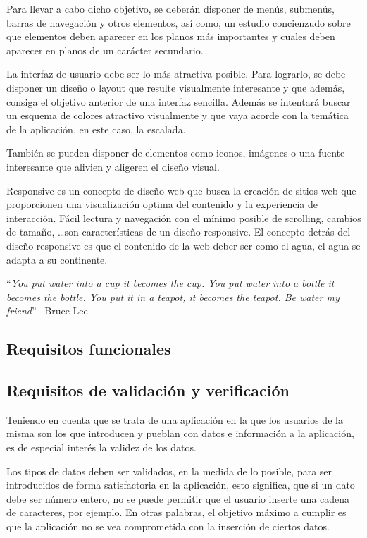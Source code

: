 Para llevar a cabo dicho objetivo, se deberán disponer de menús, submenús, barras de navegación y otros elementos, así como, un estudio concienzudo sobre que elementos deben aparecer en los planos más importantes y cuales deben aparecer en planos de un carácter secundario.

La interfaz de usuario debe ser lo más atractiva posible.
Para lograrlo, se debe disponer un diseño o layout que resulte visualmente interesante y que además, consiga el objetivo anterior de una interfaz sencilla. Además se intentará buscar un esquema de colores atractivo visualmente y que vaya acorde con la temática de la aplicación, en este caso, la escalada. 

También se pueden disponer de elementos como iconos, imágenes o una fuente interesante que alivien y aligeren el diseño visual.

Responsive es un concepto de diseño web que busca la creación de sitios web que proporcionen una visualización optima del contenido y la experiencia de interacción. Fácil lectura y navegación con el mínimo posible de scrolling, cambios de tamaño, \ldots son características de un diseño responsive. El concepto detrás del diseño responsive es que el contenido de la web deber ser como el agua, el agua se adapta a su continente.

``\textit{You put water into a cup it becomes the cup. You put water into a bottle it becomes the bottle. You put it in a teapot, it becomes the teapot. Be water my friend}'' --Bruce Lee


\subsection{Requisitos funcionales}


\subsection{Requisitos de validación y verificación}
Teniendo en cuenta que se trata de una aplicación en la que los usuarios de la misma son los que introducen y pueblan con datos e información a la aplicación, es de especial interés la validez de los datos.

Los tipos de datos deben ser validados, en la medida de lo posible, para ser introducidos de forma satisfactoria en la aplicación, esto significa, que si un dato debe ser número entero, no se puede permitir que el usuario inserte una cadena de caracteres, por ejemplo.
En otras palabras, el objetivo máximo a cumplir es que la aplicación no se vea comprometida con la inserción de ciertos datos.

